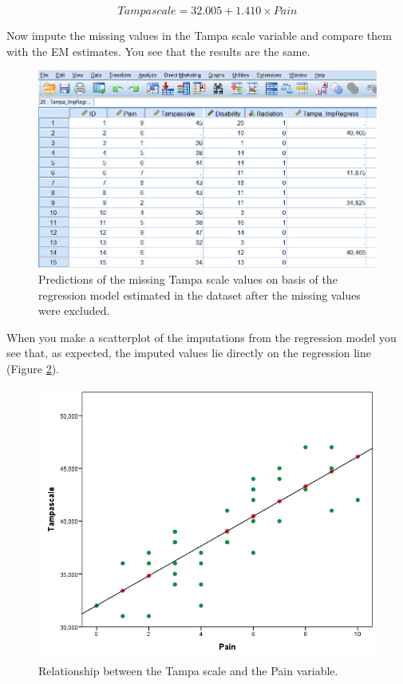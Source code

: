 \documentclass[]{book}
\begin{document}
\[Tampascale = 32.005 + 1.410 × Pain\]

Now impute the missing values in the Tampa scale variable and compare
them with the EM estimates. You see that the results are the same.

\begin{figure}

{\centering \includegraphics[width=0.7\linewidth]{images/fig3.15} 

}

\caption{Predictions of the missing Tampa scale values on basis of the regression model estimated in the dataset after the missing values were excluded.}\label{fig:fig3-15}
\end{figure}

When you make a scatterplot of the imputations from the regression model
you see that, as expected, the imputed values lie directly on the
regression line (Figure \ref{fig:fig3-16}).

\begin{figure}

{\centering \includegraphics[width=0.7\linewidth]{images/fig3.16} 

}

\caption{Relationship between the Tampa scale and the Pain variable.}\label{fig:fig3-16}
\end{figure}
\end{document}
